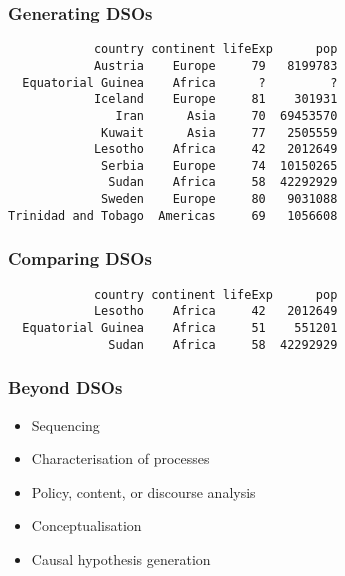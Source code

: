 \documentclass[17pt]{beamer} %
\begin{document}
\frame{}






\begin{frame}[fragile]
\frametitle{Generating DSOs}
\footnotesize
\begin{verbatim}
            country continent lifeExp      pop
            Austria    Europe     79   8199783
  Equatorial Guinea    Africa      ?         ?
            Iceland    Europe     81    301931
               Iran      Asia     70  69453570
             Kuwait      Asia     77   2505559
            Lesotho    Africa     42   2012649
             Serbia    Europe     74  10150265
              Sudan    Africa     58  42292929
             Sweden    Europe     80   9031088
Trinidad and Tobago  Americas     69   1056608
\end{verbatim}
\end{frame}



\begin{frame}[fragile]
\frametitle{Comparing DSOs}
\footnotesize
\begin{verbatim}
            country continent lifeExp      pop
            Lesotho    Africa     42   2012649
  Equatorial Guinea    Africa     51    551201
              Sudan    Africa     58  42292929
\end{verbatim}
\end{frame}



\begin{frame}
\frametitle{Beyond DSOs}

\begin{itemize}\itemsep1em
\item<2-> Sequencing
\item<3-> Characterisation of processes
\item<4-> Policy, content, or discourse analysis
\item<5-> Conceptualisation
\item<6-> Causal hypothesis generation
\end{itemize}

\end{frame}
\end{document}
